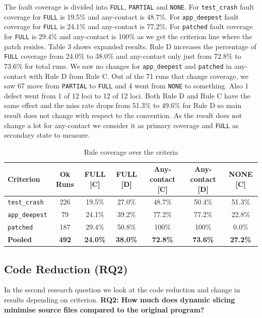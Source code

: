 \documentclass[sigconf,nonacm]{acmart}
\begin{document}
The fault coverage is divided into \texttt{FULL}, \texttt{PARTIAL} and \texttt{NONE}. For \texttt{test\_crash} fault coverage for \texttt{FULL} is 19.5\% and any-contact is 48.7\%. For \texttt{app\_deepest} fault coverage for \texttt{FULL} is 24.1\% and any-contact is 77.2\%. For \texttt{patched} fault coverage for \texttt{FULL} is 29.4\% and any-contact is 100\% as we get the criterion line where the patch resides. Table 3 shows expanded results. Rule D increases the percentage of \texttt{FULL} coverage from 24.0\% to 38.0\% and any-contact only just from 72.8\% to 73.6\% for total runs. We saw no changes for \texttt{app\_deepest} and \texttt{patched} in any-contact with Rule D from Rule C. Out of the 71 runs that change coverage, we saw 67 move from \texttt{PARTIAL} to \texttt{FULL} and 4 went from \texttt{NONE} to something. Also 1 defect went from 1 of 12 loci to 12 of 12 loci. Both Rule D and Rule C have the same effect and the miss rate drops from 51.3\% to 49.6\% for Rule D so main result does not change with respect to the convention. As the result does not change a lot for any-contact we consider it as primary coverage and \texttt{FULL} as secondary state to measure.

\begin{table}[htbp]
  \caption{Rule coverage over the criteria}
  \label{tab:rule_coverage}
  \begin{tabular}{lcccccc}
    \toprule
    Criterion & Ok Runs & FULL [C] & FULL [D] & Any-contact [C] & Any-contact [D] & NONE [C] \\
    \midrule
    \texttt{test\_crash} & 226 & 19.5\% & 27.0\% & 48.7\% & 50.4\% & 51.3\% \\
    \texttt{app\_deepest} & 79 & 24.1\% & 39.2\% & 77.2\% & 77.2\% & 22.8\% \\
    \texttt{patched} & 187 & 29.4\% & 50.8\% & 100\% & 100\% & 0.0\% \\
    \midrule
    \textbf{Pooled} & \textbf{492} & \textbf{24.0\%} & \textbf{38.0\%} & \textbf{72.8\%} & \textbf{73.6\%} & \textbf{27.2\%} \\
    \bottomrule
  \end{tabular}
\end{table}

\subsection{Code Reduction (RQ2)}

In the second research question we look at the code reduction and change in results depending on criterion. \textbf{RQ2: How much does dynamic slicing minimise source files compared to the original program?}
\end{document}
